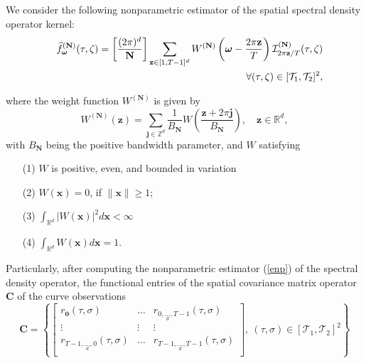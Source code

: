 \documentclass[11pt,a4paper]{article}
\begin{document}
We consider the following  nonparametric estimator of the spatial spectral density operator kernel:
\begin{eqnarray}
&&\widehat{f}_{\boldsymbol{\omega}}^{(\mathbf{N})}(\tau,\zeta)=\left[\frac{(2\pi)^{d}}{\mathbf{N}}\right]\sum_{\mathbf{z}\in [1,T-1]^{d}}  W^{(\mathbf{N})}\left(\boldsymbol{\omega} - \frac{2\pi \mathbf{z}}{T} \right) \mathcal{I}^{(\mathbf{N})}_{2\pi \mathbf{z}/T}(\tau,\zeta)\nonumber\\
&& \hspace*{3cm}\forall (\tau ,\zeta )\in [\mathcal{T}_{1},\mathcal{T}_{2}]^{2},\label{enp}
\end{eqnarray}

\noindent  where  the weight function $W^{(\mathbf{N})}$ is given by
\begin{equation}\label{Eq5}
W^{(\mathbf{N})}(\mathbf{z}) = \sum_{\boldsymbol{j}\in \mathbb{Z}^{d}}\frac{1}{B_{\mathbf{N}}} W\left(\frac{\mathbf{z} + 2\pi \boldsymbol{j}}{B_{\mathbf{N}}}\right),\quad \mathbf{z}\in \mathbb{R}^{d},
\end{equation}
\noindent with $B_{\mathbf{N}}$ being the positive  bandwidth parameter, and $W$ satisfying
\begin{itemize}
\item[(1)] $W$ is positive, even, and bounded in variation
\item[(2)] $W(\mathbf{x}) =0$, if  $ \|\mathbf{x}\|\geq 1$;
\item[(3)] $\int_{\mathbb{R}^{d}} \left|W(\mathbf{x})\right|^{2}d\mathbf{x} <\infty$
\item[(4)] $\int_{\mathbb{R}^{d}} W(\mathbf{x})d\mathbf{x} =1.$
\end{itemize}
Particularly, after computing the nonparametric estimator (\ref{enp}) of the spectral density operator, the functional entries of the  spatial covariance matrix operator $\mathbf{C}$ of the  curve observations  $$\mathbf{C}=\left\{\left[\begin{array}{lll}
r_{\mathbf{0}}(\tau ,\sigma ) & \dots & r_{0,\underset{d}{\dots},T-1}(\tau ,\sigma )\\
\vdots &\vdots &\vdots \\
r_{T-1,\underset{d}{\dots},0}(\tau ,\sigma )& \dots & r_{T-1,\underset{d}{\dots},T-1}(\tau ,\sigma )\\
\end{array}\right],\ (\tau,\sigma)\in [\mathcal{T}_{1},\mathcal{T}_{2}]^{2}\right\}$$
\end{document}
